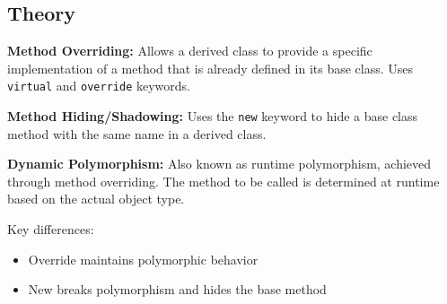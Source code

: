 \documentclass[10pt,a4paper]{article}
\begin{document}
\subsection*{Theory}
\textbf{Method Overriding:} Allows a derived class to provide a specific implementation of a method that is already defined in its base class. Uses \texttt{virtual} and \texttt{override} keywords.

\textbf{Method Hiding/Shadowing:} Uses the \texttt{new} keyword to hide a base class method with the same name in a derived class.

\textbf{Dynamic Polymorphism:} Also known as runtime polymorphism, achieved through method overriding. The method to be called is determined at runtime based on the actual object type.

Key differences:
\begin{itemize}
    \item Override maintains polymorphic behavior
    \item New breaks polymorphism and hides the base method
\end{itemize}
\end{document}
